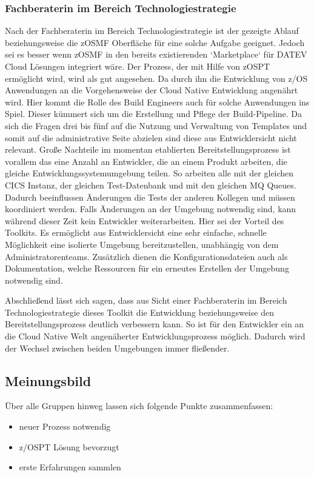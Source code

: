 \subsubsection{Fachberaterin im Bereich Technologiestrategie}
Nach der Fachberaterin im Bereich Technologiestrategie ist der gezeigte Ablauf beziehungsweise die zOSMF Oberfläche für eine solche Aufgabe geeignet.
Jedoch sei es besser wenn zOSMF in den bereits existierenden `Marketplace` für DATEV Cloud Lösungen integriert wäre.
Der Prozess, der mit Hilfe von zOSPT ermöglicht wird, wird als gut angesehen.
Da durch ihn die Entwicklung von z/OS Anwendungen an die Vorgehensweise der Cloud Native Entwicklung angenährt wird.
Hier kommt die Rolle des Build Engineers auch für solche Anwendungen ins Spiel.
Dieser kümmert sich um die Erstellung und Pflege der Build-Pipeline.
Da sich die Fragen drei bis fünf auf die Nutzung und Verwaltung von Templates und somit auf die administrative Seite abzielen sind diese aus Entwicklersicht nicht relevant.
Große Nachteile im momentan etablierten Bereitstellungsprozess ist vorallem das eine Anzahl an Entwickler, die an einem Produkt arbeiten, die gleiche Entwicklungssystemumgebung teilen.
So arbeiten alle mit der gleichen CICS Instanz, der gleichen Test-Datenbank und mit den gleichen MQ Queues.
Dadurch beeinflussen Änderungen die Tests der anderen Kollegen und müssen koordiniert werden.
Falls Änderungen an der Umgebung notwendig sind, kann während dieser Zeit kein Entwickler weiterarbeiten.
Hier sei der Vorteil des Toolkits.
Es ermöglicht aus Entwicklersicht eine sehr einfache, schnelle Möglichkeit eine isolierte Umgebung bereitzustellen, unabhängig von dem Administratorenteams.
Zusätzlich dienen die Konfigurationsdateien auch als Dokumentation, welche Ressourcen für ein erneutes Erstellen der Umgebung notwendig sind.

Abschließend lässt sich sagen, dass aus Sicht einer Fachberaterin im Bereich Technologiestrategie dieses Toolkit die Entwicklung beziehungsweise den Bereitstellungsprozess deutlich verbessern kann.
So ist für den Entwickler ein an die Cloud Native Welt angenäherter Entwicklungsprozess möglich.
Dadurch wird der Wechsel zwischen beiden Umgebungen immer fließender.

\subsection{Meinungsbild}
Über alle Gruppen hinweg lassen sich folgende Punkte zusammenfassen:

\begin{samepage}
\begin{itemize}
\item neuer Prozess notwendig
\item z/OSPT Lösung bevorzugt
\item erste Erfahrungen sammlen
\end{itemize}
\end{samepage}

